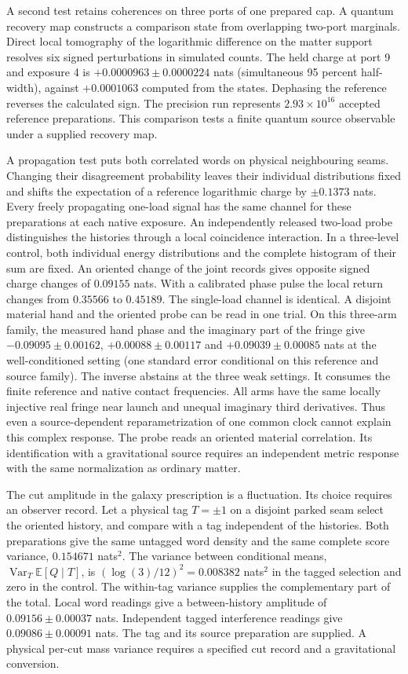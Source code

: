 \documentclass[11pt]{article}
\begin{document}
A second test retains coherences on three ports of one prepared cap.
A quantum recovery map constructs a comparison state from overlapping
two-port marginals. Direct local tomography of the logarithmic
difference on the matter support resolves six signed perturbations in
simulated counts. The held charge at port 9 and exposure 4 is
$+0.0000963\pm0.0000224$ nats (simultaneous 95 percent half-width),
against $+0.0001063$ computed from the states. Dephasing the reference
reverses the calculated sign. The precision run represents
$2.93\times10^{16}$ accepted reference preparations. This comparison
tests a finite quantum source observable under a supplied recovery map.

A propagation test puts both correlated words on physical neighbouring
seams. Changing their disagreement probability leaves their individual
distributions fixed and shifts the expectation of a reference
logarithmic charge by $\pm0.1373$ nats. Every freely propagating
one-load signal has the same channel for these preparations at
each native exposure. An independently released two-load probe
distinguishes the histories through a local coincidence interaction.
In a three-level control, both individual energy distributions and
the complete histogram of their sum are fixed. An oriented change of
the joint records gives opposite signed charge changes of $0.09155$
nats. With a calibrated phase pulse the local return changes from
$0.35566$ to $0.45189$. The single-load channel is identical.
A disjoint material hand and the oriented probe can be read in one
trial. On this three-arm family, the measured hand phase and the
imaginary part of the fringe give $-0.09095\pm0.00162$,
$+0.00088\pm0.00117$ and $+0.09039\pm0.00085$ nats at the
well-conditioned setting (one standard error conditional on this reference
and source family). The inverse abstains at the three
weak settings. It consumes the finite reference and native contact
frequencies. All arms have the same locally injective real fringe
near launch and unequal imaginary third derivatives. Thus even a
source-dependent reparametrization of one common clock cannot explain
this complex response. The probe reads an oriented material correlation.
Its identification with a gravitational source requires an independent
metric response with the same normalization as ordinary matter.

The cut amplitude in the galaxy prescription is a fluctuation. Its
choice requires an observer record. Let a physical tag $T=\pm1$ on a
disjoint parked seam select the oriented history, and compare with a tag
independent of the histories. Both preparations give the same untagged
word density and the same complete score variance, $0.154671$ nats$^2$.
The variance between conditional means, $\operatorname{Var}_T
\mathbb E[Q\mid T]$, is $(\log(3)/12)^2=0.008382$ nats$^2$ in the
tagged selection and zero in the control. The within-tag variance supplies
the complementary part of the total. Local word readings give a
between-history amplitude of $0.09156\pm0.00037$ nats. Independent
tagged interference readings give $0.09086\pm0.00091$ nats. The
tag and its source preparation are supplied. A physical per-cut mass
variance requires a specified cut record and a gravitational conversion.
\end{document}
